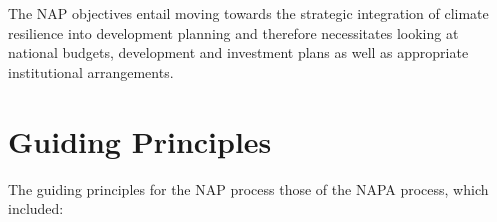 \documentclass[
]{book}
\begin{document}
The NAP objectives entail moving towards the strategic integration of climate resilience into development planning and therefore necessitates looking at national budgets, development and investment plans as well as appropriate institutional arrangements.

\hypertarget{guiding-principles}{%
\section{Guiding Principles}\label{guiding-principles}}

The guiding principles for the NAP process those of the NAPA process, which included:

\providecommand{\docline}[3]{\noalign{\global\setlength{\arrayrulewidth}{#1}}\arrayrulecolor[HTML]{#2}\cline{#3}}

\setlength{\tabcolsep}{2pt}

\renewcommand*{\arraystretch}{1.5}
\end{document}
